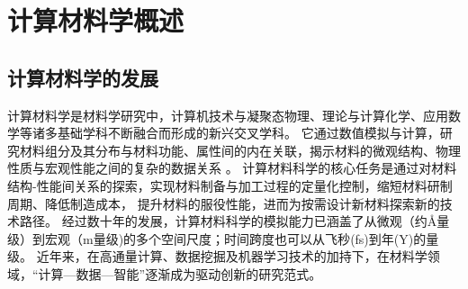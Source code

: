 \chapter{计算材料学概述}

\section{计算材料学的发展}
计算材料学是材料学研究中，计算机技术与凝聚态物理、理论与计算化学、应用数学等诸多基础学科不断融合而形成的新兴交叉学科。
它通过数值模拟与计算，研究材料组分及其分布与材料功能、属性间的内在关联，揭示材料的微观结构、物理性质与宏观性能之间的复杂的数据关系%
。
计算材料科学的核心任务是通过对材料结构-性能间关系的探索，实现材料制备与加工过程的定量化控制，缩短材料研制周期、降低制造成本，%
{提升材料的服役性能，进而为按需设计新材料探索新的技术路径。}%
经过数十年的发展，计算材料科学的模拟能力已涵盖了从微观（约\textrm{\AA}量级）到宏观（\textrm{m}量级)的多个空间尺度；时间跨度也可以从飞秒\textrm{(fs)}到年\textrm{(Y)}的量级。
近年来，在高通量计算、数据挖掘及机器学习技术的加持下，在材料学领域，``计算—数据—智能''逐渐成为驱动创新的研究范式。


